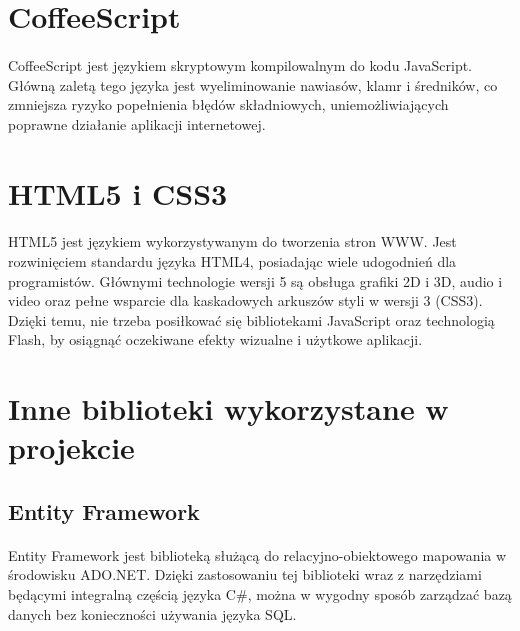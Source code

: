 \section{CoffeeScript} %
\label{sec:coffeescript}
\paragraph{} %
\label{par:}

CoffeeScript jest językiem skryptowym kompilowalnym do kodu JavaScript. Główną zaletą tego języka jest wyeliminowanie nawiasów, klamr i średników, co zmniejsza ryzyko popełnienia błędów składniowych, uniemożliwiających poprawne działanie aplikacji internetowej.

\section{HTML5 i CSS3} %
\label{par:html5_i_css3}
\paragraph{} %
\label{par:}
HTML5 jest językiem wykorzystywanym do tworzenia stron WWW. Jest rozwinięciem standardu języka HTML4, posiadając wiele udogodnień dla programistów. Głównymi technologie wersji 5 są obsługa grafiki 2D i 3D, audio i video oraz pełne wsparcie dla kaskadowych arkuszów styli w wersji 3 (CSS3). Dzięki temu, nie trzeba posiłkować się bibliotekami JavaScript oraz technologią Flash, by osiągnąć oczekiwane efekty wizualne i użytkowe aplikacji.


\section{Inne biblioteki wykorzystane w projekcie} %
\label{sec:inne_biblioteki_wykorzystane_w_projekcie}

\subsection{Entity Framework} 
\label{sub:EntityFramework}
\paragraph{}
Entity Framework jest biblioteką służącą do relacyjno-obiektowego mapowania w środowisku ADO.NET. Dzięki zastosowaniu tej biblioteki wraz z narzędziami będącymi integralną częścią języka C\#, można w wygodny sposób zarządzać bazą danych bez konieczności używania języka SQL.

